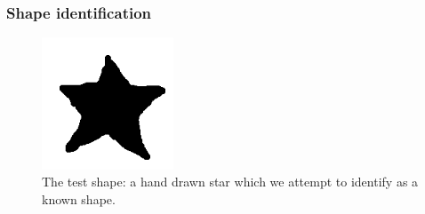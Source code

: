 \documentclass[a4paper, 12pt]{article}
\begin{document}
\subsubsection{Shape identification\label{sec:shapematch}}

\begin{figure}[!h]
  \centering
  \includegraphics[width=0.35\textwidth]{img/shapematch/test_star.png}
  \caption[Hand drawn test image]{The test shape: a hand drawn star which we attempt to identify as a known shape.}
  \label{fig:hand_star}
\end{figure}
\end{document}
